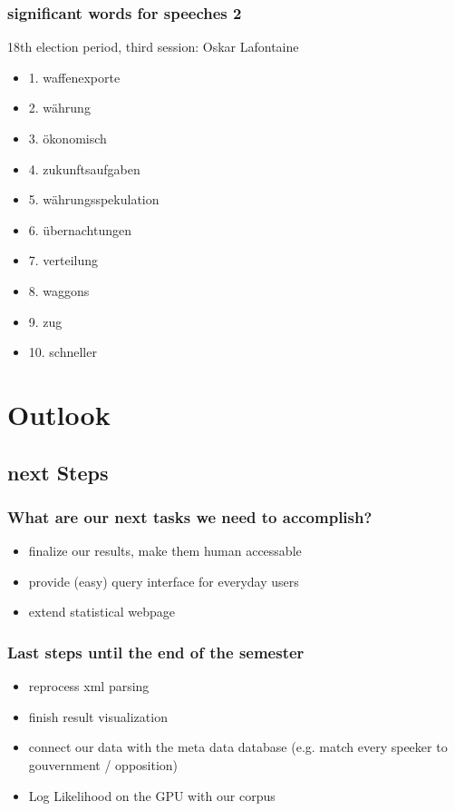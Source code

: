 \documentclass[11pt, a4paper]{beamer}
\begin{document}
\begin{frame}
\frametitle{significant words for speeches 2}
18th election period, third session: Oskar Lafontaine
\begin{itemize}
\item 1. waffenexporte
\item 2. währung
\item 3. ökonomisch
\item 4. zukunftsaufgaben
\item 5. währungsspekulation
\item 6. übernachtungen
\item 7. verteilung
\item 8. waggons
\item 9. zug
\item 10. schneller
\end{itemize}
\end{frame}

\section{Outlook}

\subsection{next Steps}
\begin{frame}
\frametitle{What are our next tasks we need to accomplish?}
\begin{itemize}
	\item finalize our results, make them human accessable
	\item provide (easy) query interface for everyday users
	\item extend statistical webpage
\end{itemize}
\end{frame}

\begin{frame}
\frametitle{Last steps until the end of the semester}
\begin{itemize}
	\item reprocess xml parsing
	\item finish result visualization 
	\item connect our data with the meta data database (e.g. match every speeker to gouvernment / opposition)
	\item Log Likelihood on the GPU with our corpus
\end{itemize}
\end{frame}
\end{document}
